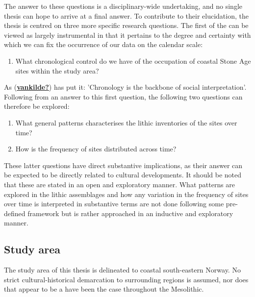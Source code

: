\documentclass[
  a4paper,
  oneside]{uiophdthesis}
\providecommand{\tightlist}{%
  \setlength{\itemsep}{0pt}\setlength{\parskip}{0pt}}
\begin{document}
The answer to these questions is a disciplinary-wide undertaking, and no single thesis can hope to arrive at a final answer. To contribute to their elucidation, the thesis is centred on three more specific research questions. The first of the can be viewed as largely instrumental in that it pertains to the degree and certainty with which we can fix the occurrence of our data on the calendar scale:

\begin{enumerate}
\def\labelenumi{\arabic{enumi})}
\tightlist
\item
  What chronological control do we have of the occupation of coastal Stone Age sites within the study area?
\end{enumerate}

As (\protect\hyperlink{ref-vankilde}{\textbf{vankilde?}}) has put it: 'Chronology is the backbone of social interpretation'. Following from an answer to this first question, the following two questions can therefore be explored:

\begin{enumerate}
\def\labelenumi{\arabic{enumi})}
\setcounter{enumi}{1}
\tightlist
\item
  What general patterns characterises the lithic inventories of the sites over time?
\item
  How is the frequency of sites distributed across time?
\end{enumerate}

These latter questions have direct substantive implications, as their answer can be expected to be directly related to cultural developments. It should be noted that these are stated in an open and exploratory manner. What patterns are explored in the lithic assemblages and how any variation in the frequency of sites over time is interpreted in substantive terms are not done following some pre-defined framework but is rather approached in an inductive and exploratory manner.

\hypertarget{study-area}{%
\subsection{Study area}\label{study-area}}

The study area of this thesis is delineated to coastal south-eastern Norway. No strict cultural-historical demarcation to surrounding regions is assumed, nor does that appear to be a have been the case throughout the Mesolithic.
\end{document}
